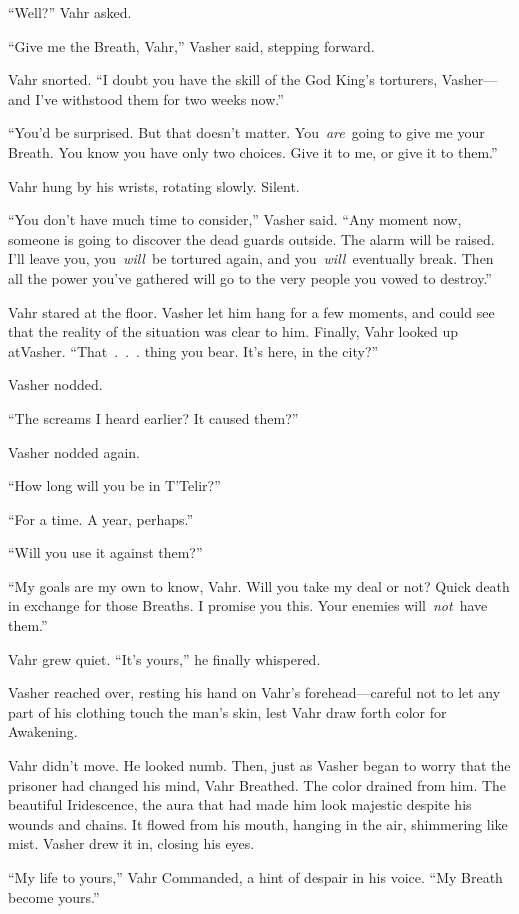 “Well?” Vahr asked.

“Give me the Breath, Vahr,” Vasher said, stepping forward.

Vahr snorted. “I doubt you have the skill of the God King’s torturers, Vasher—and I’ve withstood them for two weeks now.”

“You’d be surprised. But that doesn’t matter. You~\textit{are}~going to give me your Breath. You know you have only two choices. Give it to me, or give it to them.”

Vahr hung by his wrists, rotating slowly. Silent.

“You don’t have much time to consider,” Vasher said. “Any moment now, someone is going to discover the dead guards outside. The alarm will be raised. I’ll leave you, you~\textit{will}~be tortured again, and you~\textit{will}~eventually break. Then all the power you’ve gathered will go to the very people you vowed to destroy.”

Vahr stared at the floor. Vasher let him hang for a few moments, and could see that the reality of the situation was clear to him. Finally, Vahr looked up atVasher. “That~.~.~. thing you bear. It’s here, in the city?”

Vasher nodded.

“The screams I heard earlier? It caused them?”

Vasher nodded again.

“How long will you be in T’Telir?”

“For a time. A year, perhaps.”

“Will you use it against them?”

“My goals are my own to know, Vahr. Will you take my deal or not? Quick death in exchange for those Breaths. I promise you this. Your enemies will~\textit{not}~have them.”

Vahr grew quiet. “It’s yours,” he finally whispered.

Vasher reached over, resting his hand on Vahr’s forehead—careful not to let any part of his clothing touch the man’s skin, lest Vahr draw forth color for Awakening.

Vahr didn’t move. He looked numb. Then, just as Vasher began to worry that the prisoner had changed his mind, Vahr Breathed. The color drained from him. The beautiful Iridescence, the aura that had made him look majestic despite his wounds and chains. It flowed from his mouth, hanging in the air, shimmering like mist. Vasher drew it in, closing his eyes.

“My life to yours,” Vahr Commanded, a hint of despair in his voice. “My Breath become yours.”

